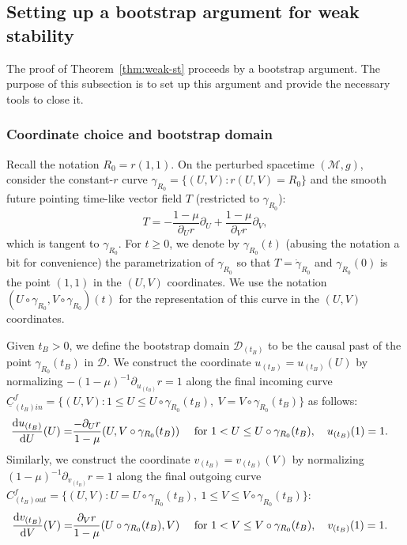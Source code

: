 \documentclass[10pt, reqno]{amsart}
\theoremstyle{definition}
\theoremstyle{remark}
\theoremstyle{conjecture}
\numberwithin{equation}{section}
\newcommand{\set}[1]{\{#1\}}
\newcommand{\ud}{\mathrm{d}}
\newcommand{\rd}{\partial}
\newcommand{\0}{\emptyset}
\newcommand{\gmm}{\gamma}
\newcommand{\calD}{\mathcal D}
\newcommand{\calM}{\mathcal M}
\newcommand{\uC}{\underline{C}}
\newcommand{\M}{\calM}							%
\begin{document}
\subsection{Setting up a bootstrap argument for weak stability} \label{subsec:btstrp}
The proof of Theorem~\ref{thm:weak-st} proceeds by a bootstrap argument. 
The purpose of this subsection is to set up this argument and provide the necessary tools to close it. 

\subsubsection*{Coordinate choice and bootstrap domain}
Recall the notation $R_{0} = r(1, 1)$. On the perturbed spacetime $(\M, g)$, consider the constant-$r$ curve
$\gmm_{R_{0}} = \set{(U, V) : r(U, V) = R_{0}}$
and the smooth future pointing time-like vector field $T$ (restricted to $\gmm_{R_{0}}$):
\begin{equation} \label{eq:vf-T-0}
	T  = - \frac{1-\mu}{\rd_{U} r} \rd_{U} + \frac{1-\mu}{\rd_{V} r} \rd_{V},
\end{equation}
which is tangent to $\gmm_{R_{0}}$.
For $t \geq 0$, we denote by $\gmm_{R_{0}}(t)$ (abusing the notation a bit for convenience) the parametrization of $\gmm_{R_{0}}$ so that $T = \dot{\gmm}_{R_{0}}$ and $\gmm_{R_{0}}(0)$ is the point $(1, 1)$ in the $(U, V)$ coordinates. We use the notation $(U \circ \gmm_{R_{0}}, V \circ \gmm_{R_{0}})(t)$ for the representation of this curve in the $(U,V)$ coordinates.

Given $t_{B} > 0$, we define the bootstrap domain $\calD_{(t_{B})}$ to be the causal past of the point $\gmm_{R_{0}}(t_{B})$ in $\calD$. We construct the coordinate $u_{(t_{B})} = u_{(t_{B})}(U)$ by normalizing $-(1-\mu)^{-1} \rd_{u_{(t_{B})}} r = 1$ along the final incoming curve $\uC_{(t_{B}) in}^{f} = \set{(U, V) : 1 \leq U \leq U \circ \gmm_{R_{0}}(t_{B}), \ V = V \circ \gmm_{R_{0}}(t_{B})}$ as follows:
\begin{align}
\frac{\ud u_{(t_{B})}}{\ud U}(U) =& \frac{- \rd_{U} r}{1-\mu}(U, V \circ \gmm_{R_{0}}(t_{B}))  \quad \hbox{ for } 1 < U \leq U\circ \gmm_{R_{0}}(t_{B}), \quad u_{(t_{B})}(1) = 1. \label{eq:u-tB-cond}
\end{align}
Similarly, we construct the coordinate $v_{(t_{B})} = v_{(t_{B})} (V)$ by normalizing $(1-\mu)^{-1} \rd_{v_{(t_{B})}} r = 1$ along the final outgoing curve $C_{(t_{B}) out}^{f} = \set{(U, V) : U = U\circ \gmm_{R_{0}}(t_{B}), \ 1\leq V \leq V\circ \gmm_{R_{0}}(t_{B})}$:
\begin{align}
\frac{\ud v_{(t_{B})}}{\ud V}(V) =& \frac{\rd_{V} r}{1-\mu}(U \circ \gmm_{R_{0}}(t_{B}), V)  \quad \hbox{ for } 1 < V \leq V\circ \gmm_{R_{0}}(t_{B}), \quad v_{(t_{B})}(1) = 1. \label{eq:v-tB-cond}
\end{align}
\end{document}
